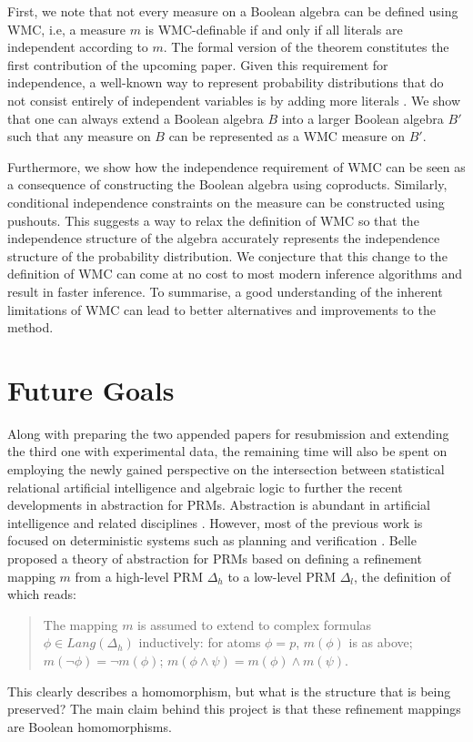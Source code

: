 \documentclass{article}
\begin{document}
First, we note that not every measure on a Boolean algebra can be defined using
WMC, i.e, a measure $m$ is WMC-definable if and only if all literals are
independent according to $m$. The formal version of the theorem constitutes the
first contribution of the upcoming paper. Given this requirement for
independence, a well-known way to represent probability distributions that do
not consist entirely of independent variables is by adding more literals
\cite{DBLP:journals/ai/ChaviraD08}. We show that one can always extend a Boolean
algebra $B$ into a larger Boolean algebra $B'$ such that any measure on $B$ can
be represented as a WMC measure on $B'$.

Furthermore, we show how the independence requirement of WMC can be seen as a
consequence of constructing the Boolean algebra using coproducts. Similarly,
conditional independence constraints on the measure can be constructed using
pushouts. This suggests a way to relax the definition of WMC so that the
independence structure of the algebra accurately represents the independence
structure of the probability distribution. We conjecture that this change to the
definition of WMC can come at no cost to most modern inference algorithms and
result in faster inference. To summarise, a good understanding of the inherent
limitations of WMC can lead to better alternatives and improvements to the
method.

\section{Future Goals}

Along with preparing the two appended papers for resubmission and extending the
third one with experimental data, the remaining time will also be spent on
employing the newly gained perspective on the intersection between statistical
relational artificial intelligence and algebraic logic to further the recent
developments in abstraction for PRMs. Abstraction is abundant in artificial
intelligence and related disciplines \cite{saitta2013abstraction}. However, most
of the previous work is focused on deterministic systems such as planning and
verification \cite{DBLP:journals/ai/GiunchigliaW92}. Belle
\cite{DBLP:journals/corr/abs-1810-02434} proposed a theory of abstraction for
PRMs based on defining a refinement mapping $m$ from a high-level PRM $\Delta_h$
to a low-level PRM $\Delta_l$, the definition of which reads:
\begin{quote}
  The mapping $m$ is assumed to extend to complex formulas $\phi \in
  \mathit{Lang}(\Delta_h)$ inductively: for atoms $\phi = p$, $m(\phi)$ is as
  above; $m(\neg\phi) = \neg m(\phi)$; $m(\phi \land \psi) = m(\phi) \land
  m(\psi)$.
\end{quote}
This clearly describes a homomorphism, but what is the structure that is being
preserved? The main claim behind this project is that these refinement mappings
are Boolean homomorphisms.
\end{document}
